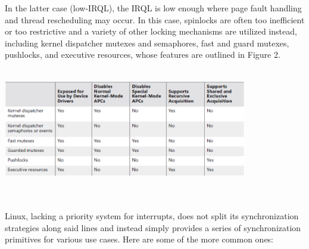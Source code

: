 \documentclass[onecolumn, draftclsnofoot,10pt, compsoc]{IEEEtran}
\begin{document}
In the latter case (low-IRQL), the IRQL is low enough where page fault handling and thread rescheduling may occur. In this case, spinlocks are often too inefficient or too restrictive and a variety of other locking mechanisms are utilized instead, including kernel dispatcher mutexes and semaphores, fast and guard mutexes, pushlocks, and executive resources, whose features are outlined in Figure 2.\\ \\
\begin{minipage}{\linewidth}
\begin{center}
\includegraphics[width=0.8\textwidth]{table.eps}
\end{center}
\end{minipage}
\\ \\ Linux, lacking a priority system for interrupts, does not split its synchronization strategies along said lines and instead simply provides a series of synchronization primitives for various use cases. Here are some of the more common ones:
\end{document}
